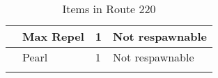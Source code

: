 \begin{longtable}{|| l l l l ||}%
\hline%
&Max Repel&1&Not respawnable\\%
\hline%
&Pearl&1&Not respawnable\\%
\hline%
\endhead%
\hline%
\caption{Items in Route 220}%
\label{tab:Route220Items}%
\end{longtable}